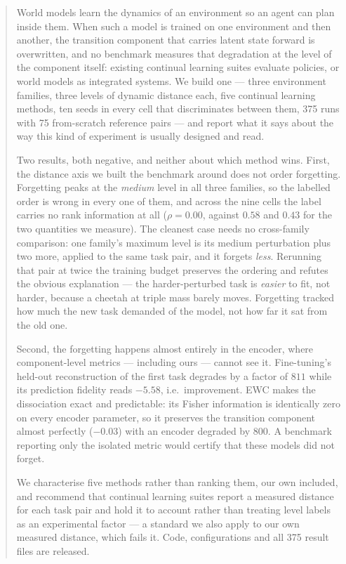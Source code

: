 %

\begin{abstract}
World models learn the dynamics of an environment so an agent can plan inside
them. When such a model is trained on one environment and then another, the
transition component that carries latent state forward is overwritten, and no
benchmark measures that degradation at the level of the component itself:
existing continual learning suites evaluate policies, or world models as
integrated systems. We build one --- three environment families, three levels
of dynamic distance each, five continual learning methods, ten seeds in every
cell that discriminates between them, 375 runs with 75 from-scratch reference
pairs --- and report what it says about the way this kind of experiment is
usually designed and read.

Two results, both negative, and neither about which method wins. First, the
distance axis we built the benchmark around does not order forgetting.
Forgetting peaks at the \emph{medium} level in all three families, so the
labelled order is wrong in every one of them, and across the nine cells the
label carries no rank information at all ($\rho = 0.00$, against $0.58$ and
$0.43$ for the two quantities we measure). The cleanest case needs no
cross-family comparison: one family's maximum level is its medium perturbation
plus two more, applied to the same task pair, and it forgets \emph{less}.
Rerunning that pair at twice the training budget preserves the ordering and
refutes the obvious explanation --- the harder-perturbed task is \emph{easier}
to fit, not harder, because a cheetah at triple mass barely moves. Forgetting
tracked how much the new task demanded of the model, not how far it sat from
the old one.

Second, the forgetting happens almost entirely in the encoder, where
component-level metrics --- including ours --- cannot see it. Fine-tuning's
held-out reconstruction of the first task degrades by a factor of $811$ while
its prediction fidelity reads $-5.58$, i.e.\ improvement. EWC makes the
dissociation exact and predictable: its Fisher information is identically zero
on every encoder parameter, so it preserves the transition component almost
perfectly ($-0.03$) with an encoder degraded by $800$. A benchmark reporting
only the isolated metric would certify that these models did not forget.

We characterise five methods rather than ranking them, our own included, and
recommend that continual learning suites report a measured distance for each
task pair and hold it to account rather than treating level labels as an
experimental factor --- a standard we also apply to our own measured distance,
which fails it. Code, configurations and all 375 result files are released.
\end{abstract}
